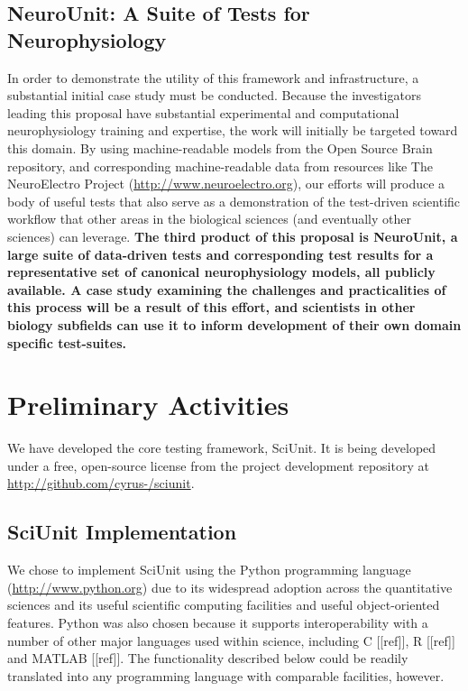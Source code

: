 \documentclass[11pt,letterpaper]{article}
\begin{document}
\subsection{NeuroUnit: A Suite of Tests for Neurophysiology}\label{neurounit}
In order to demonstrate the utility of this framework and infrastructure, a substantial initial case study must be conducted. Because the investigators leading this proposal have substantial experimental and computational neurophysiology training and expertise, the work will initially be targeted toward this domain. By using machine-readable models from the Open Source Brain repository, and corresponding machine-readable data from resources like The NeuroElectro Project (\url{http://www.neuroelectro.org}), our efforts will produce a body of useful tests that also serve as a demonstration of the test-driven scientific workflow that other areas in the biological sciences (and eventually other sciences) can leverage.  \textbf{The third product of this proposal is \textbf{NeuroUnit}, a large suite of data-driven tests and corresponding test results for a representative set of canonical neurophysiology models, all publicly available. A case study examining the challenges and practicalities of this process will be a result of this effort, and scientists in other biology subfields can use it to inform development of their own domain specific test-suites.}

\section{Preliminary Activities}
We have developed the core testing framework, SciUnit. It is being developed under a free, open-source license from the project development repository at \url{http://github.com/cyrus-/sciunit}.  

\subsection{SciUnit Implementation} We chose to implement SciUnit using the Python programming language (\url{http://www.python.org}) due to its widespread adoption across the quantitative sciences and its useful scientific computing facilities and useful object-oriented features. Python was also chosen because it supports interoperability with a number of other major languages used within science, including C [[ref]], R [[ref]] and MATLAB [[ref]]. The functionality described below could be readily translated into any programming language with comparable facilities, however.
\end{document}
